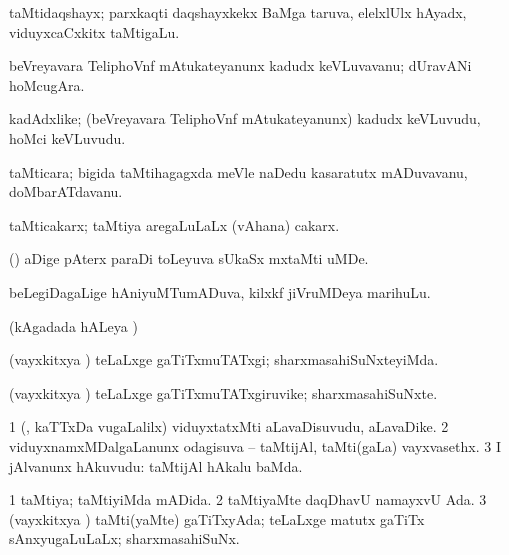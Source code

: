 {{{{{{\bentry
{}
  \gl{\nA}\bmng
taMtidaqshayx; parxkaqti daqshayxkekx BaMga taruva, elelxlUlx hAyadx, viduyxcaCxkitx taMtigaLu. 
\emng
\eentry

\bentry
{}
  \gl{\nA}\bmng
beVreyavara TeliphoVnf mAtukateyanunx kadudx keVLuvavanu; dUravANi hoMcugAra. 
\emng
\eentry

\bentry
{}
  \gl{\nA}\bmng
kadAdxlike; (beVreyavara TeliphoVnf mAtukateyanunx) kadudx keVLuvudu, hoMci keVLuvudu. 
\emng
\eentry

\bentry
{}
  \gl{\nA}\bmng
taMticara; bigida taMtihagagxda meVle naDedu kasaratutx mADuvavanu, doMbarATdavanu. 
\emng
\eentry

\bentry
{}
 \gl{\nA}\bmng
taMticakarx; taMtiya aregaLuLaLx (vAhana) cakarx. 
\emng
\eentry

\bentry
{}
 \gl{\nA}\bmng
(\kanmu) aDige pAterx paraDi toLeyuva sUkaSx mxtaMti uMDe. 
\emng
\eentry

\bentry
{}
  \gl{\nA}\bmng
beLegiDagaLige hAniyuMTumADuva, kilxkf jiVruMDeya marihuLu. 
\emng
\eentry

\bentry
{}
  \gl{\gu}\bmng
(kAgadada hALeya \vi) 
\emng
\eentry

\bentry
{}
  \gl{\kirxvi}\bmng
(vayxkitxya \vi) teLaLxge gaTiTxmuTATxgi; sharxmasahiSuNxteyiMda. 
\emng
\eentry

\bentry
{}
  \gl{\nA}\bmng
(vayxkitxya \vi) teLaLxge gaTiTxmuTATxgiruvike; sharxmasahiSuNxte. 
\emng
\eentry

\bentry
{}
  \gl{\nA}\bmng
\bnum
\num{1} (\kanmu, kaTTxDa \mo vugaLalilx) viduyxtatxMti aLavaDisuvudu, aLavaDike. 
\num{2} viduyxnamxMDalgaLanunx odagisuva -- taMtijAl, taMti(gaLa) vayxvasethx. 
\num{3} I jAlvanunx hAkuvudu:  taMtijAl hAkalu baMda. 
\enum
\emng
\eentry

\bentry
{} 
\gl{\gu}
\bmng
\bnum
\num{1} taMtiya; taMtiyiMda mADida. 
\num{2} taMtiyaMte daqDhavU namayxvU Ada. 
\num{3} (vayxkitxya \vi) taMti(yaMte) gaTiTxyAda; teLaLxge matutx gaTiTx sAnxyugaLuLaLx; sharxmasahiSuNx. 
\enum
\emng
\eentry

}}}}}}
